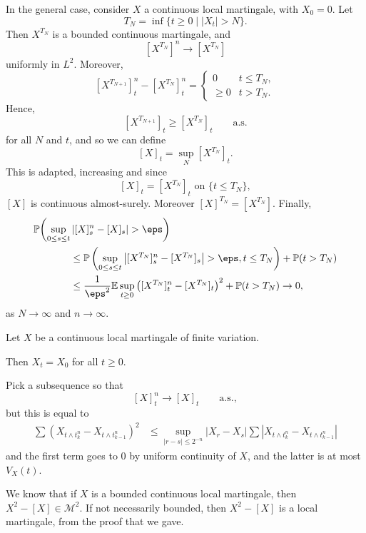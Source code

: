 \documentclass[12pt]{article}
\begin{document}
\begin{proofbox}
	In the general case, consider $X$ a continuous local martingale, with $X_0 = 0$. Let
	\[
		T_N = \inf \{t \geq 0 \mid |X_t| > N\}.
	\]
	Then $X^{T_N}$ is a bounded continuous martingale, and
	\[
		[X^{T_N}]^n \to [X^{T_N}]
	\]
	uniformly in $L^2$. Moreover,
	\[
		[X^{T_{N+1}}]_t^n - [X^{T_N}]_t^n =
		\begin{cases}
			0 & t \leq T_N, \\
			\geq 0 & t > T_N.
		\end{cases}
	\]
	Hence,
	\[
		[X^{T_{N+1}}]_t \geq [X^{T_N}]_t \qquad \text{a.s.}
	\]
	for all $N$ and $t$, and so we can define
	\[
		[X]_t = \sup_N [X^{T_N}]_t.
	\]
	This is adapted, increasing and since
	\[
		[X]_t = [X^{T_N}]_t \text{ on } \{t \leq T_N\},
	\]
	$[X]$ is continuous almost-surely. Moreover $[X]^{T_N} = [X^{T_N}]$. Finally,
	\begin{align*}
		\mathbb{P} \biggl( \sup_{0 \leq s \leq t}& \left|[X]_s^n - [X]_s \right| > \eps \biggr) \\
		& \leq \mathbb{P}\left( \sup_{0 \leq s \leq t} \left| [X^{T_N}]_s^n - [X^{T_N}]_s \right| > \eps, t \leq T_N\right) + \mathbb{P}(t > T_N) \\
												      &\leq \frac{1}{\eps^2} \mathbb{E} \sup_{t \geq 0} \left([X^{T_N}]_t^{n} - [X^{T_N}]_t \right)^2 + \mathbb{P}(t > T_N) \to 0,
	\end{align*}
	as $N \to \infty$ and $n \to \infty$.
\end{proofbox}

\begin{proposition}
	Let $X$ be a continuous local martingale of finite variation.

	Then $X_t = X_0$ for all $t \geq 0$.
\end{proposition}

\begin{proofbox}
	Pick a subsequence so that
	\[
		[X]_t^{n} \to [X]_t \qquad \text{a.s.},
	\]
	but this is equal to
	\begin{align*}
		\sum (X_{t \wedge t_k^n} - X_{t \wedge t_{k-1}^n} )^2 & \leq \sup_{|r - s| \leq 2^{-n}} |X_r - X_s| \sum |X_{t \wedge t_k^n} - X_{t \wedge t_{k-1}^{n}}|
	\end{align*}
	and the first term goes to $0$ by uniform continuity of $X$, and the latter is at most $V_X(t)$.
\end{proofbox}


We know that if $X$ is a bounded continuous local martingale, then $X^2 - [X] \in \mathcal{M}^2$. If not necessarily bounded, then $X^2 - [X]$ is a local martingale, from the proof that we gave.
\end{document}
